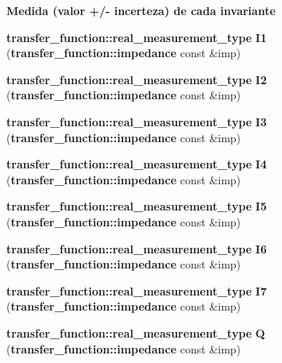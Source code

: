 \begin{Indent}{\bf Medida (valor +/- incerteza) de cada invariante}\par
\begin{CompactItemize}
\item 
{\bf transfer\_\-function::real\_\-measurement\_\-type} \textbf{I1} ({\bf transfer\_\-function::impedance} const \&imp)\label{namespaceerro__manual_1_1base__xi__eta_1_1wal__invariant_0a69d5b5f6de27a8cff44e3861482e20}

\item 
{\bf transfer\_\-function::real\_\-measurement\_\-type} \textbf{I2} ({\bf transfer\_\-function::impedance} const \&imp)\label{namespaceerro__manual_1_1base__xi__eta_1_1wal__invariant_bdcd83836522214a8ac2f4383d8e8767}

\item 
{\bf transfer\_\-function::real\_\-measurement\_\-type} \textbf{I3} ({\bf transfer\_\-function::impedance} const \&imp)\label{namespaceerro__manual_1_1base__xi__eta_1_1wal__invariant_8ca277a2ca2a322e45c02d8325a6e88a}

\item 
{\bf transfer\_\-function::real\_\-measurement\_\-type} \textbf{I4} ({\bf transfer\_\-function::impedance} const \&imp)\label{namespaceerro__manual_1_1base__xi__eta_1_1wal__invariant_5d0c90744756f67a6bfd9f976d225896}

\item 
{\bf transfer\_\-function::real\_\-measurement\_\-type} \textbf{I5} ({\bf transfer\_\-function::impedance} const \&imp)\label{namespaceerro__manual_1_1base__xi__eta_1_1wal__invariant_d765f48818889fcd91061a052b01f2d3}

\item 
{\bf transfer\_\-function::real\_\-measurement\_\-type} \textbf{I6} ({\bf transfer\_\-function::impedance} const \&imp)\label{namespaceerro__manual_1_1base__xi__eta_1_1wal__invariant_8262f95c5cfb35bf58b155ee40af3889}

\item 
{\bf transfer\_\-function::real\_\-measurement\_\-type} \textbf{I7} ({\bf transfer\_\-function::impedance} const \&imp)\label{namespaceerro__manual_1_1base__xi__eta_1_1wal__invariant_42e250e21e2415de0ee08f99e2aad74e}

\item 
{\bf transfer\_\-function::real\_\-measurement\_\-type} \textbf{Q} ({\bf transfer\_\-function::impedance} const \&imp)\label{namespaceerro__manual_1_1base__xi__eta_1_1wal__invariant_df427fc84f61b58b098369d3c1a0f089}


\end{CompactItemize}
\end{Indent}
